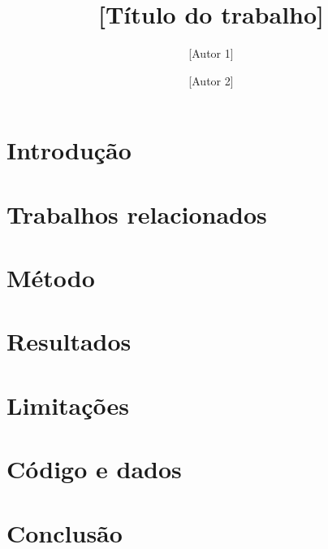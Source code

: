 \documentclass{insperai}
\title{[Título do trabalho]}
\author{[Autor 1] \and [Autor 2]}   %
\begin{document}
\maketitle

\section{Introdução}

\section{Trabalhos relacionados}

\section{Método}

\section{Resultados}

\section{Limitações}

\section{Código e dados}

\section{Conclusão}




\end{document}
